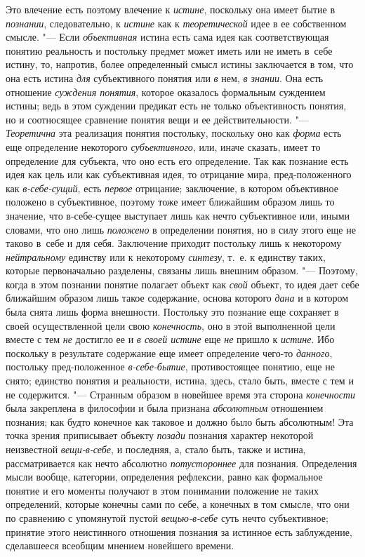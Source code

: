 Это влечение есть поэтому влечение к {\em истине}, поскольку
она имеет бытие в {\em познании}, следовательно, к {\em истине} как к
{\em теоретической} идее в ее собственном смысле. "--- Если
{\em объективная} истина
есть сама идея как соответствующая понятию реальность и постольку предмет
может иметь или не иметь в~себе истину, то, напротив, более определенный
смысл истины заключается в том, что она есть истина
{\em для} субъективного понятия или {\em в} нем, {\em в знании}. Она есть
отношение {\em суждения понятия},
которое оказалось формальным суждением истины; ведь в этом
суждении предикат есть не только объективность понятия, но и соотносящее
сравнение понятия вещи и ее действительности. "---
{\em Теоретична} эта реализация понятия постольку, поскольку оно как
{\em форма} есть еще определение некоторого {\em субъективного}, или,
иначе сказать, имеет то определение для субъекта, что оно есть его
определение. Так как познание есть идея как цель или как субъективная идея,
то отрицание мира, пред-положенного как {\em в-себе-сущий}, есть
{\em первое} отрицание;
заключение, в котором объективное положено в субъективное, поэтому тоже
имеет ближайшим образом лишь то значение, что в-себе-сущее выступает лишь
как нечто субъективное или, иными словами, что оно лишь
{\em положено} в
определении понятия, но в силу этого еще не таково в~себе и для себя.
Заключение приходит постольку лишь к некоторому
{\em нейтральному} единству или к некоторому {\em синтезу}, т.~е. к
единству таких, которые первоначально разделены, связаны лишь внешним
образом. "--- Поэтому, когда в этом познании понятие полагает
объект как {\em свой}
объект, то идея дает себе ближайшим образом лишь такое
содержание, основа которого {\em дана}
и в котором была снята лишь форма внешности. Постольку это
познание еще сохраняет в своей осуществленной цели свою
{\em конечность}, оно в этой выполненной цели вместе с тем
{\em не} достигло ее и {\em в своей истине} еще
{\em не} пришло к {\em истине}. Ибо
поскольку в результате содержание еще имеет определение чего-то
{\em данного}, постольку
пред-положенное {\em в-себе-бытие},
противостоящее понятию, еще не снято; единство понятия и
реальности, истина, здесь, стало быть, вместе с тем и не содержится. "---
Странным образом в новейшее время эта сторона {\em конечности} была
закреплена в философии и была признана {\em абсолютным} отношением
познания;
как будто конечное как таковое и должно было быть абсолютным!
Эта точка зрения приписывает объекту {\em позади} познания
характер некоторой неизвестной {\em вещи-в-себе}, и
последняя, а, стало быть, также и истина, рассматривается
как нечто абсолютно {\em потустороннее}
для познания. Определения мысли вообще, категории,
определения рефлексии, равно как формальное понятие и его моменты получают
в этом понимании положение не таких определений, которые конечны сами по
себе, а конечных в том смысле, что они по сравнению с упомянутой пустой
{\em вещью-в-себе} суть
нечто субъективное; принятие этого неистинного отношения познания за
истинное есть заблуждение, сделавшееся всеобщим мнением новейшего времени.

